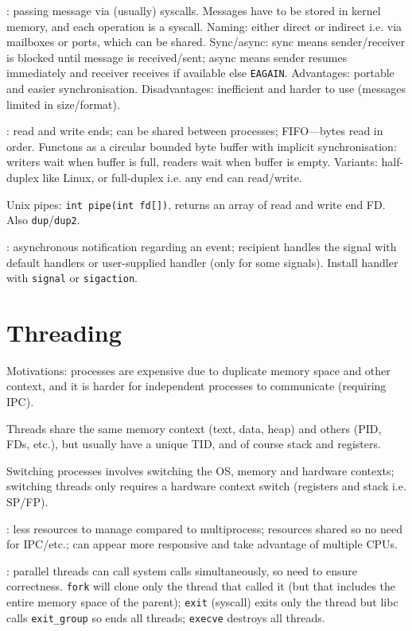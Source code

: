 \documentclass[fontsize=9pt]{slnotes}
\newcommand\benefits{\checkmark}
\newcommand\problems{\textsymbol{✗}}
\begin{document}
: passing message via (usually) syscalls. Messages have to be stored in kernel memory, and each operation is a syscall. Naming: either direct or indirect i.e. via mailboxes or ports, which can be shared. Sync/async: sync means sender/receiver is blocked until message is received/sent; async means sender resumes immediately and receiver receives if available else \texttt{EAGAIN}. Advantages: portable and easier synchronisation. Disadvantages: inefficient and harder to use (messages limited in size/format).

: read and write ends; can be shared between processes; FIFO---bytes read in order. Functons as a circular bounded byte buffer with implicit synchronisation: writers wait when buffer is full, readers wait when buffer is empty. Variants: half-duplex like Linux, or full-duplex i.e. any end can read/write.

Unix pipes: \texttt{int pipe(int fd[])}, returns an array of read and write end FD. Also \texttt{dup}/\texttt{dup2}.

: asynchronous notification regarding an event; recipient handles the signal with default handlers or user-supplied handler (only for some signals). Install handler with \texttt{signal} or \texttt{sigaction}.

\chapter{Threading}
Motivations: processes are expensive due to duplicate memory space and other context, and it is harder for independent processes to communicate (requiring IPC).

Threads share the same memory context (text, data, heap) and others (PID, FDs, etc.), but usually have a unique TID, and of course stack and registers.

Switching processes involves switching the OS, memory and hardware contexts; switching threads only requires a hardware context switch (registers and stack i.e. SP/FP).

\benefits: less resources to manage compared to multiprocess; resources shared so no need for IPC/etc.; can appear more responsive and take advantage of multiple CPUs.

\problems: parallel threads can call system calls simultaneously, so need to ensure correctness. \texttt{fork} will clone only the thread that called it (but that includes the entire memory space of the parent); \texttt{exit} (syscall) exits only the thread but libc calls \texttt{exit\_group} so ends all threads; \texttt{execve} destroys all threads.
\end{document}

